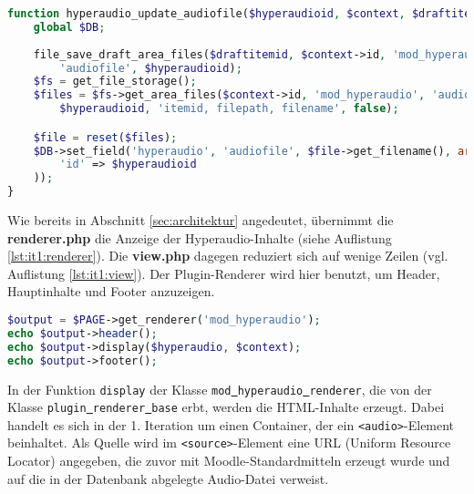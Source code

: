 \begin{lstlisting}[language=php,
             linewidth=\textwidth,
             caption={Ausschnitt der \textbf{locallib.php} in der 1. Iteration},
             label={lst:it1:locallib}]
function hyperaudio_update_audiofile($hyperaudioid, $context, $draftitemid) {
    global $DB;
    
    file_save_draft_area_files($draftitemid, $context->id, 'mod_hyperaudio',
        'audiofile', $hyperaudioid);
    $fs = get_file_storage();
    $files = $fs->get_area_files($context->id, 'mod_hyperaudio', 'audiofile',
        $hyperaudioid, 'itemid, filepath, filename', false);

    $file = reset($files);
    $DB->set_field('hyperaudio', 'audiofile', $file->get_filename(), array(
        'id' => $hyperaudioid
    ));
}
\end{lstlisting}

Wie bereits in Abschnitt \ref{sec:architektur} angedeutet, übernimmt die \textbf{renderer.php} die Anzeige der Hyperaudio-Inhalte (siehe Auflistung \ref{lst:it1:renderer}). Die \textbf{view.php} dagegen reduziert sich auf wenige Zeilen (vgl. Auflistung \ref{lst:it1:view}). Der Plugin-Renderer wird hier benutzt, um Header, Hauptinhalte und Footer anzuzeigen.

\begin{lstlisting}[language=php,
deletekeywords={header},
             linewidth=\textwidth,
             caption={Ausschnitt der \textbf{view.php} in der 1. Iteration},
             label={lst:it1:view}]
$output = $PAGE->get_renderer('mod_hyperaudio');
echo $output->header();
echo $output->display($hyperaudio, $context);
echo $output->footer();
\end{lstlisting}

In der Funktion \texttt{display} der Klasse \mbox{\texttt{mod\underline{{ }}hyperaudio\underline{{ }}renderer}}, die von der Klasse \mbox{\texttt{plugin\underline{{ }}renderer\underline{{ }}base}} erbt, werden die HTML-Inhalte erzeugt. Dabei handelt es sich in der 1. Iteration um einen Container, der ein \texttt{<audio>}-Element beinhaltet. Als Quelle wird im \texttt{<source>}-Element eine URL (Uniform Resource Locator) angegeben, die zuvor mit Moodle-Standardmitteln erzeugt wurde und auf die in der Datenbank abgelegte Audio-Datei verweist.

